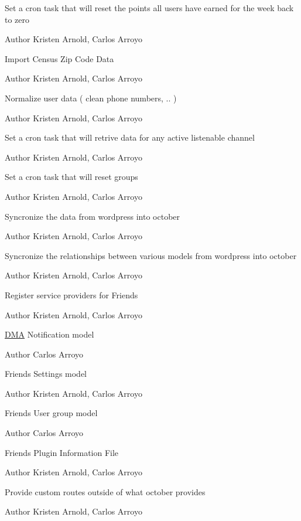 Set a cron task that will reset the points all users have earned for the week back to zero

\begin{DoxyAuthor}{Author}
Kristen Arnold, Carlos Arroyo
\end{DoxyAuthor}
Import Census Zip Code Data

\begin{DoxyAuthor}{Author}
Kristen Arnold, Carlos Arroyo
\end{DoxyAuthor}
Normalize user data ( clean phone numbers, .. )

\begin{DoxyAuthor}{Author}
Kristen Arnold, Carlos Arroyo
\end{DoxyAuthor}
Set a cron task that will retrive data for any active listenable channel

\begin{DoxyAuthor}{Author}
Kristen Arnold, Carlos Arroyo
\end{DoxyAuthor}
Set a cron task that will reset groups

\begin{DoxyAuthor}{Author}
Kristen Arnold, Carlos Arroyo
\end{DoxyAuthor}
Syncronize the data from wordpress into october

\begin{DoxyAuthor}{Author}
Kristen Arnold, Carlos Arroyo
\end{DoxyAuthor}
Syncronize the relationships between various models from wordpress into october

\begin{DoxyAuthor}{Author}
Kristen Arnold, Carlos Arroyo
\end{DoxyAuthor}
Register service providers for Friends

\begin{DoxyAuthor}{Author}
Kristen Arnold, Carlos Arroyo
\end{DoxyAuthor}
\hyperlink{namespaceDMA}{D\+M\+A} Notification model  \begin{DoxyAuthor}{Author}
Carlos Arroyo
\end{DoxyAuthor}
Friends Settings model  \begin{DoxyAuthor}{Author}
Kristen Arnold, Carlos Arroyo
\end{DoxyAuthor}
Friends User group model  \begin{DoxyAuthor}{Author}
Carlos Arroyo
\end{DoxyAuthor}
Friends Plugin Information File

\begin{DoxyAuthor}{Author}
Kristen Arnold, Carlos Arroyo
\end{DoxyAuthor}
Provide custom routes outside of what october provides

\begin{DoxyAuthor}{Author}
Kristen Arnold, Carlos Arroyo 
\end{DoxyAuthor}
